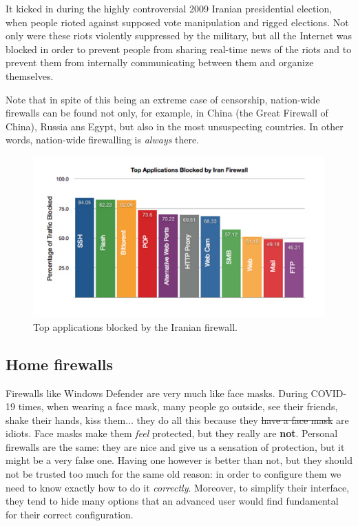 It kicked in during the highly controversial 2009 Iranian presidential election, when people rioted against supposed vote manipulation and rigged elections. Not only were these riots violently suppressed by the military, but all the Internet was blocked in order to prevent people from sharing real-time news of the riots and to prevent them from internally communicating between them and organize themselves.

Note that in spite of this being an extreme case of censorship, nation-wide firewalls can be found not only, for example, in China (the Great Firewall of China), Russia ans Egypt, but also in the most unsuspecting countries. In other words, nation-wide firewalling is \textit{always} there.

\begin{figure}[H]
    \centering
    \includegraphics[scale=1]{img/l7_filtering_iran_3.png}
    \decoRule
    \caption{Top applications blocked by the Iranian firewall.}
    \label{fig:l7_filtering_iran_3}
\end{figure}


\subsection{Home firewalls}
Firewalls like Windows Defender are very much like face masks. During COVID-19 times, when wearing a face mask, many people go outside, see their friends, shake their hands, kiss them... they do all this because they \sout{have a face mask} are idiots. Face masks make them \textit{feel} protected, but they really are \textbf{not}. Personal firewalls are the same: they are nice and give us a sensation of protection, but it might be a very false one. Having one however is better than not, but they should not be trusted too much for the same old reason: in order to configure them we need to know exactly how to do it \textit{correctly}. Moreover, to simplify their interface, they tend to hide many options that an advanced user would find fundamental for their correct configuration.

